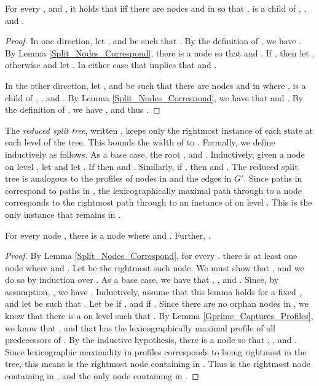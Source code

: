 \documentclass{LMCS}
\newcommand{\Gprime}{\ensuremath{G'}\xspace}
\begin{document}
\begin{lem}\label{Split_Paths_Correspond}
For every , and , it holds that  iff there are nodes  and  in  so that ,  is
a child of , , and . 
\end{lem}
\begin{proof}
In one direction, let , and  be such that . By the
definition of , we have .  By Lemma \ref{Split_Nodes_Correspond}, there is a
node  so that  and .  If , then let , otherwise   and let . In either case that  implies that
 and . 

In the other direction, let , and  be such that there are nodes  and  in 
where ,  is a child of , , and . By Lemma
\ref{Split_Nodes_Correspond}, we have that  and . By
the definition of , we have , and thus .
\end{proof}

The \emph{reduced split tree}, written , keeps only the rightmost 
instance of each state at each level of the tree. This bounds the width of
 to . Formally, we define  inductively as follows. As a base
case, the root , and .
Inductively, given a node  on level , let  and
let .
If  then 
and .  Similarly, if
, then  and
.
The reduced split tree is analogous to the profiles of nodes in  and the edges in \Gprime.
Since paths in  correspond to paths in , the lexicographically
maximal path through  to a node  corresponds to the rightmost
path through  to an instance of  on level .  This is the only
instance that remains in .

\begin{lem}\label{Reduced_Split_Nodes}
For every node , there is a node  where
 and . Further, .
\end{lem}
\begin{proof}
By Lemma \ref{Split_Nodes_Correspond}, for every . there is at least one node  where  and . Let  be the rightmost such node. We must show
that , and we do so by induction over . As a base case, we have that , , and . Since, by assumption, , we have
. Inductively, assume that this lemma holds for a fixed , and let  be such
that . Let  be  if , and  if . Since
there are no orphan nodes in , we know that there is a  on level  such that
.  By Lemma \ref{Gprime_Captures_Profiles}, we know that
, and that  has the lexicographically
maximal profile of all predecessors of .   By the inductive hypothesis, there is a node  so that
, , and . Since lexicographic maximality in profiles
corresponds to being rightmost in the tree, this means  is the rightmost node containing  in
. Thus  is the rightmost node containing  in , and the only node containing
 in .
\end{proof}
\end{document}
